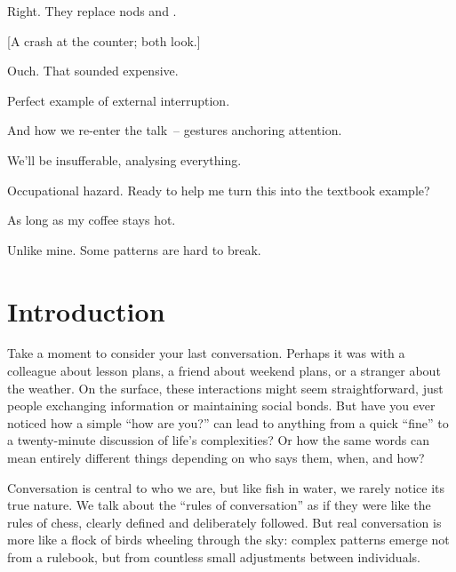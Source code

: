 \begin{sloppypar}
\begin{dialogue}
\item[Nao] Right. They replace nods and . 

[A crash at the counter; both look.]

\item[Jim] Ouch. That sounded expensive.

\item[Nao] Perfect example of external interruption.

\item[Jim] And how we re-enter the talk~-- gestures anchoring attention.

\item[Nao] We'll be insufferable, analysing everything.

\item[Jim] Occupational hazard. Ready to help me turn this into the textbook example?

\item[Nao] As long as my coffee stays hot.

\item[Jim] Unlike mine. Some patterns are hard to break.
\end{dialogue}

\end{sloppypar}

\section{Introduction} \label{sec:intro-hidden}

Take a moment to consider your last conversation. Perhaps it was with a colleague about lesson plans, a friend about weekend plans, or a stranger about the weather. On the surface, these interactions might seem straightforward, just people exchanging information or maintaining social bonds. But have you ever noticed how a simple \enquote{how are you?} can lead to anything from a quick \enquote{fine} to a twenty-minute discussion of life's complexities? Or how the same words can mean entirely different things depending on who says them, when, and how?

Conversation is central to who we are, but like fish in water, we rarely notice its true nature. We talk about the \enquote{rules of conversation} as if they were like the rules of chess, clearly defined and deliberately followed. But real conversation is more like a flock of birds wheeling through the sky: complex patterns emerge not from a rulebook, but from countless small adjustments between individuals.

